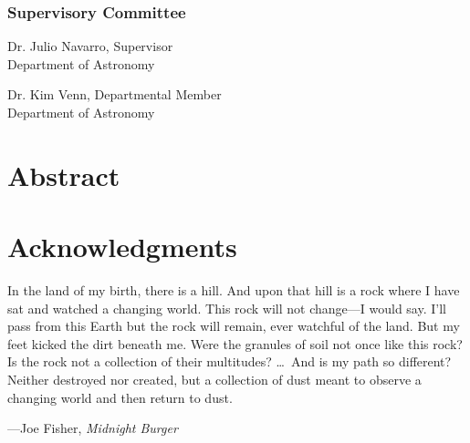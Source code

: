 \documentclass[12pt,oneside,letterpaper]{report}
\newcommand{\skipline}{\vspace{\baselineskip}}
\begin{document}
\subsection*{Supervisory Committee}
\skipline

Dr. Julio Navarro, Supervisor\\
Department of Astronomy \\
\skipline

\noindent Dr. Kim Venn, Departmental Member\\
Department of Astronomy\\


\chapter*{Abstract}



\tableofcontents
\listoffigures
\listoftables

\chapter*{Acknowledgments}





%
%
%
%
%
%
%
%
\newpage
\thispagestyle{empty}

\renewcommand{\epigraphflush}{center}
{}
       \vspace*{6\baselineskip}
\setlength{\epigraphwidth}{0.5\textwidth}

\epigraph{
In the land of my birth, there is a hill. And upon that hill is a rock where I have sat and watched a changing world. This rock will not change---I would say. I'll pass from this Earth but the rock will remain, ever watchful of the land.
But my feet kicked the dirt beneath me. Were the granules of soil not once like this rock? Is the rock not a collection of their multitudes? \ldots\ And is my path so different? Neither destroyed nor created, but a collection of dust meant to observe a changing world and then return to dust. 
}{---Joe Fisher, {\it Midnight Burger}}
\end{document}
